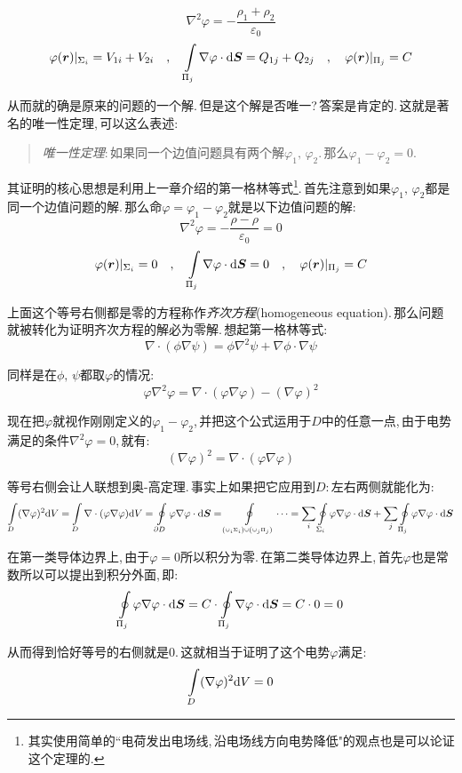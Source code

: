 \[\nabla^2\varphi=-\frac{\rho_1+\rho_2}{\varepsilon_0}\]
\[\varphi(\boldsymbol{r})|_{\Sigma_i}=V_{1i}+V_{2i} \quad, \quad \int\limits_{\Pi_j}\nabla\varphi\cdot \textrm{d} \boldsymbol{S}=Q_{1j}+Q_{2j} \quad, \quad \varphi(\boldsymbol{r})|_{\Pi_j}=C\]

从而就的确是原来的问题的一个解.\,但是这个解是否唯一?\,答案是肯定的.\,这就是著名的唯一性定理,\,可以这么表述:
\begin{verse}
\emph{唯一性定理}:\,如果同一个边值问题具有两个解$\varphi_1,\,\varphi_2$.\,那么$\varphi_1-\varphi_2= 0$.
\end{verse} 	 

其证明的核心思想是利用上一章介绍的第一格林等式\footnote{其实使用简单的``电荷发出电场线,\,沿电场线方向电势降低"的观点也是可以论证这个定理的.}.\,首先注意到如果$\varphi_1,\,\varphi_2$都是同一个边值问题的解.\,那么命$\varphi=\varphi_1-\varphi_2$就是以下边值问题的解:
\[\nabla^2\varphi=-\frac{\rho-\rho}{\varepsilon_0}=0\]
\[\varphi(\boldsymbol{r})|_{\Sigma_i}=0 \quad, \quad \int\limits_{\Pi_j}\nabla\varphi\cdot \textrm{d} \boldsymbol{S}=0 \quad, \quad \varphi(\boldsymbol{r})|_{\Pi_j}=C\]

上面这个等号右侧都是零的方程称作\emph{齐次方程}(homogeneous equation).\,那么问题就被转化为证明齐次方程的解必为零解.\,想起第一格林等式:
\[\nabla\cdot(\phi\nabla\psi)=\phi\nabla^2\psi+\nabla\phi\cdot\nabla\psi\]

同样是在$\phi,\,\psi$都取$\varphi$的情况:
\[\varphi\nabla^2\varphi=\nabla\cdot(\varphi\nabla\varphi)-(\nabla\varphi)^2\]

现在把$\varphi$就视作刚刚定义的$\varphi_1-\varphi_2$,\,并把这个公式运用于$D$中的任意一点,\,由于电势满足的条件$\nabla^2\varphi=0$,\,就有:
\[(\nabla\varphi)^2=\nabla\cdot(\varphi \nabla\varphi)\]

等号右侧会让人联想到奥-高定理.\,事实上如果把它应用到$D$:\,左右两侧就能化为:
\[\int\limits_D(\nabla\varphi)^2\textrm{d} V=\int\limits_D \nabla\cdot(\varphi \nabla\varphi)\textrm{d} V=\oint\limits_{\partial D}\varphi\nabla\varphi \cdot \textrm{d} \boldsymbol{S}=\oint\limits_{\scriptscriptstyle\left(\cup_i \Sigma_i\right)\cup \left(\cup_j\Pi_j  \right)}\cdots=\sum_i \oint\limits_{\Sigma_i}\varphi\nabla\varphi \cdot \textrm{d} \boldsymbol{S}+\sum_j \oint\limits_{\Pi_j}\varphi\nabla\varphi \cdot \textrm{d} \boldsymbol{S}\]

在第一类导体边界上,\,由于$\varphi=0$所以积分为零.\,在第二类导体边界上,\,首先$\varphi$也是常数所以可以提出到积分外面,\,即:
\[\oint\limits_{\Pi_j}\varphi\nabla\varphi \cdot \textrm{d} \boldsymbol{S}=C\cdot\oint\limits_{\Pi_j}\nabla\varphi \cdot \textrm{d} \boldsymbol{S}=C\cdot 0=0\]

从而得到恰好等号的右侧就是$0$.\,这就相当于证明了这个电势$\varphi$满足:
\[\int\limits_D(\nabla\varphi)^2\textrm{d} V=0\]

